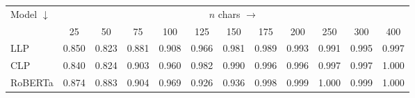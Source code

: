\begin{tabular}{lccccccccccc}
\toprule
Model $\downarrow$ & \multicolumn{11}{c}{$n$ chars $\rightarrow$} \\
 & 25 & 50 & 75 & 100 & 125 & 150 & 175 & 200 & 250 & 300 & 400 \\
\midrule
LLP & 0.850 & 0.823 & 0.881 & 0.908 & 0.966 & 0.981 & 0.989 & 0.993 & 0.991 & 0.995 & 0.997 \\
CLP & 0.840 & 0.824 & 0.903 & 0.960 & 0.982 & 0.990 & 0.996 & 0.996 & 0.997 & 0.997 & 1.000 \\
RoBERTa & 0.874 & 0.883 & 0.904 & 0.969 & 0.926 & 0.936 & 0.998 & 0.999 & 1.000 & 0.999 & 1.000 \\
\bottomrule
\end{tabular}
